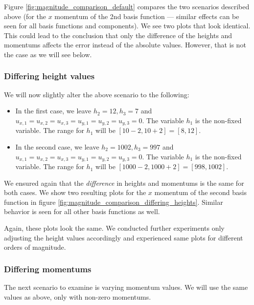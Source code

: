 \documentclass[a4paper, twoside]{article}
\begin{document}


Figure \ref{fig:magnitude_comparison_default} compares the two scenarios described above (for the $x$ momentum of the 2nd basis function --- similar effects can be seen for all basis functions and components). We see two plots that look identical. This could lead to the conclusion that only the difference of the heights and momentums affects the error instead of the absolute values. However, that is not the case as we will see below.

\subsubsection{Differing height values}
\label{sec:ord1-magnitude-non-std-values1}

We will now slightly alter the above scenario to the following:

\begin{itemize}
\item In the first case, we leave $h_2=12, h_3=7$ and $u_{x,1}=u_{x,2}=u_{x,3}=u_{y,1}=u_{y,2}=u_{y,3}=0$. The variable $h_1$ is the non-fixed variable. The range for $h_1$ will be $[10-2, 10+2]=[8,12]$.
\item In the second case, we leave $h_2=1002, h_3=997$ and $u_{x,1}=u_{x,2}=u_{x,3}=u_{y,1}=u_{y,2}=u_{y,3}=0$. The variable $h_1$ is the non-fixed variable. The range for $h_1$ will be $[1000-2, 1000+2]=[998,1002]$.
\end{itemize}

We ensured again that the \emph{difference} in heights and momentums is the same for both cases. We show two resulting plots for the $x$ momentum of the second basis function in figure \ref{fig:magnitude_comparison_differing_heights}. Similar behavior is seen for all other basis functions as well.



Again, these plots look the same. We conducted further experiments only adjusting the height values accordingly and experienced same plots for different orders of magnitude.

\subsubsection{Differing momentums}
\label{sec:ord1-magnitude-differing-momentums}

The next scenario to examine is varying momentum values. We will use the same values as above, only with non-zero momentums.
\end{document}

